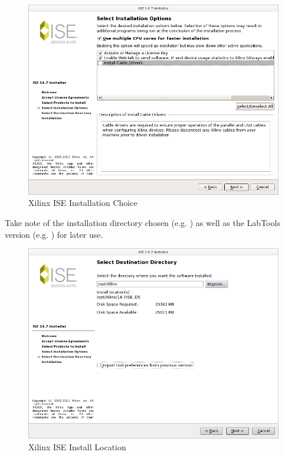 \begin{flushleft}
\begin{flushleft}
\begin{enumerate}
\begin{figure}[H]
	\centerline{\includegraphics[scale=0.4]{figures/xilinx_labtools_choose_installation}}
	\caption{Xilinx ISE Installation Choice}
\end{figure}
\pagebreak
Take note of the installation directory chosen (e.g. ) as well as the LabTools version (e.g. ) for later use.
\begin{figure}[H]
	\centerline{\includegraphics[scale=0.4]{figures/xilinx_ise_install_location}}
	\caption{Xilinx ISE Install Location}
\end{figure}
\end{enumerate}



\end{flushleft}
\end{flushleft}
